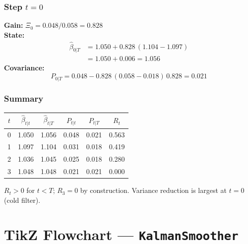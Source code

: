 \documentclass[10pt,a4paper,twocolumn]{article}
\begin{document}
\subsubsection{Step $t=0$}

\begin{tcolorbox}[exbox={Backward Step at {$t=0$}}]
\textbf{Gain:} $\Xi_0 = 0.048 / 0.058 = 0.828$\\[3pt]
\textbf{State:}
\begin{align*}
  \hat\beta_{0|T} &= 1.050 + 0.828\,(1.104 - 1.097)\\
                  &= 1.050 + 0.006 = 1.056
\end{align*}
\textbf{Covariance:}
\[
  P_{0|T} = 0.048 - 0.828\,(0.058 - 0.018)\,0.828 = 0.021
\]
\end{tcolorbox}

\subsubsection{Summary}

\begin{tcolorbox}[resultbox={Numerical Example Summary}]
\begin{center}\small
\begin{tabular}{@{}cccccc@{}}
\toprule
$t$ & $\hat\beta_{t|t}$ & $\hat\beta_{t|T}$
    & $P_{t|t}$ & $P_{t|T}$ & $R_t$\\\midrule
0 & 1.050 & 1.056 & 0.048 & 0.021 & 0.563\\
1 & 1.097 & 1.104 & 0.031 & 0.018 & 0.419\\
2 & 1.036 & 1.045 & 0.025 & 0.018 & 0.280\\
3 & 1.048 & 1.048 & 0.021 & 0.021 & 0.000\\
\bottomrule
\end{tabular}
\end{center}
$R_t > 0$ for $t < T$; $R_3 = 0$ by construction.
Variance reduction is largest at $t=0$ (cold filter).
\end{tcolorbox}

\section{TikZ Flowchart --- \texttt{KalmanSmoother}}
\end{document}
